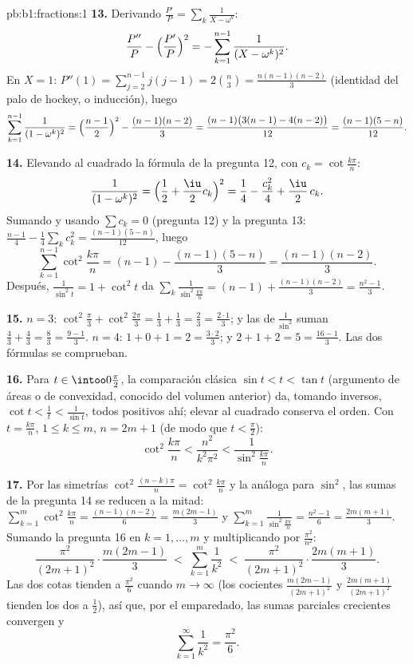 \begin{solution}{pb:b1:fractions:1}
\textbf{13.} Derivando $\frac{P'}P = \sum_k\frac1{X - \omega^k}$:
\[
\frac{P''}P - \Bigl(\frac{P'}P\Bigr)^2
= -\sum_{k=1}^{n-1}\frac1{(X - \omega^k)^2} .
\]
En $X = 1$: $P''(1) = \sum_{j=2}^{n-1}j(j-1) = 2\binom n3 =
\frac{n(n-1)(n-2)}3$ (identidad del palo de hockey, o inducción), luego
\[
\sum_{k=1}^{n-1}\frac1{(1 - \omega^k)^2}
= \Bigl(\frac{n-1}2\Bigr)^2 - \frac{(n-1)(n-2)}3
= \frac{(n-1)\bigl(3(n-1) - 4(n-2)\bigr)}{12}
= \frac{(n-1)(5-n)}{12} .
\]

\textbf{14.} Elevando al cuadrado la fórmula de la pregunta 12, con
$c_k = \cot\frac{k\pi}n$:
\[
\frac1{(1-\omega^k)^2}
= \Bigl(\frac12 + \frac\iu2 c_k\Bigr)^2
= \frac14 - \frac{c_k^2}4 + \frac\iu2\,c_k .
\]
Sumando y usando $\sum c_k = 0$ (pregunta 12) y la pregunta 13:
$\frac{n-1}4 - \frac14\sum_k c_k^2 = \frac{(n-1)(5-n)}{12}$, luego
\[
\sum_{k=1}^{n-1}\cot^2\frac{k\pi}n
= (n-1) - \frac{(n-1)(5-n)}3 = \frac{(n-1)(n-2)}3 .
\]
Después, $\frac1{\sin^2t} = 1 + \cot^2t$ da
$\sum_k\frac1{\sin^2\frac{k\pi}n} = (n-1) + \frac{(n-1)(n-2)}3 =
\frac{n^2-1}3$.

\textbf{15.} $n = 3$: $\cot^2\frac\pi3 + \cot^2\frac{2\pi}3 =
\frac13 + \frac13 = \frac23 = \frac{2\cdot1}3$; y las de
$\frac1{\sin^2}$ suman $\frac43 + \frac43 = \frac83 = \frac{9-1}3$.
$n = 4$: $1 + 0 + 1 = 2 = \frac{3\cdot2}3$; y $2 + 1 + 2 = 5 =
\frac{16-1}3$. Las dos fórmulas se comprueban.

\textbf{16.} Para $t \in \intoo0{\frac\pi2}$, la comparación clásica
$\sin t < t < \tan t$ (argumento de áreas o de convexidad, conocido del
volumen anterior) da, tomando inversos, $\cot t < \frac1t <
\frac1{\sin t}$, todos positivos ahí; elevar al cuadrado conserva el
orden. Con $t = \frac{k\pi}n$, $1 \leq k \leq m$, $n = 2m+1$ (de modo
que $t < \frac\pi2$):
\[
\cot^2\frac{k\pi}n < \frac{n^2}{k^2\pi^2} <
\frac1{\sin^2\frac{k\pi}n} .
\]

\textbf{17.} Por las simetrías $\cot^2\frac{(n-k)\pi}n =
\cot^2\frac{k\pi}n$ y la análoga para $\sin^2$, las sumas de la
pregunta 14 se reducen a la mitad:
$\sum_{k=1}^{m}\cot^2\frac{k\pi}n = \frac{(n-1)(n-2)}6 =
\frac{m(2m-1)}3$ y $\sum_{k=1}^m\frac1{\sin^2\frac{k\pi}n} =
\frac{n^2-1}6 = \frac{2m(m+1)}3$. Sumando la pregunta 16 en
$k = 1, \dots, m$ y multiplicando por $\frac{\pi^2}{n^2}$:
\[
\frac{\pi^2}{(2m+1)^2}\cdot\frac{m(2m-1)}3
\;<\; \sum_{k=1}^{m}\frac1{k^2} \;<\;
\frac{\pi^2}{(2m+1)^2}\cdot\frac{2m(m+1)}3 .
\]
Las dos cotas tienden a $\frac{\pi^2}6$ cuando $m \to \infty$ (los
cocientes $\frac{m(2m-1)}{(2m+1)^2}$ y $\frac{2m(m+1)}{(2m+1)^2}$
tienden los dos a $\frac12$), así que, por el emparedado, las sumas
parciales crecientes convergen y
\[
\sum_{k=1}^{\infty}\frac1{k^2} = \frac{\pi^2}6 .
\]


\end{solution}
